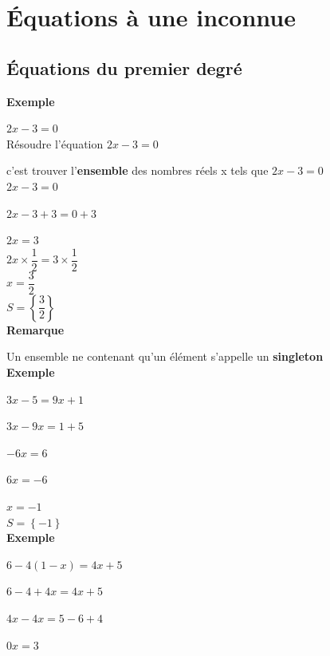 \ifdefined\COMPLETE
\else
    
    
\fi


\section{Équations à une inconnue}

\subsection{Équations du premier degré}

\textbf{Exemple }

$ 2x - 3 = 0 $ \\

Résoudre l'équation $ 2x-3=0$

c'est trouver l'\textbf{ensemble} des nombres réels x tels que $2x-3=0$ \\

$ 2x-3=0$

$ 2x-3+3 = 0+3$ 

$2x=3$ \\

$ 2x \times \dfrac{1}{2} = 3 \times \dfrac{1}{2} $ \\

$ x = \dfrac{3}{2} $ \\

$ S = \left\lbrace\dfrac{3}{2}\right\rbrace $ \\

\textbf{Remarque}

Un ensemble ne contenant qu'un élément s'appelle un \textbf{singleton} \\

\textbf{Exemple }

$ 3x-5=9x+1 $

$ 3x-9x=1+5 $

$-6x=6 $

$6x=-6 $

$x = -1 $ \\

$ S = \left\lbrace-1\right\rbrace $ \\

\textbf{Exemple }

$ 6-4\left(1-x\right) = 4x+5 $

$ 6 - 4 + 4x = 4x + 5 $

$ 4x - 4x = 5 -6 + 4 $

$ 0x = 3  $ \\

